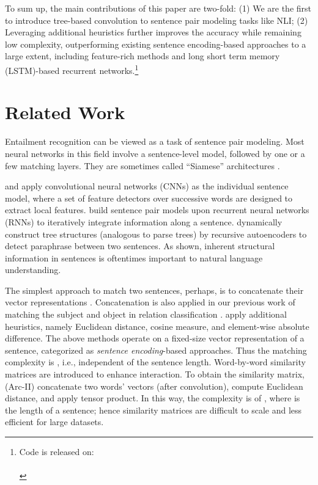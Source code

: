 \documentclass[11pt]{article}
\begin{document}
To sum up, the main contributions of this paper are two-fold: (1) We are the first to introduce tree-based convolution to sentence pair modeling tasks like NLI; (2) Leveraging additional heuristics further improves the accuracy while remaining low complexity, outperforming existing sentence encoding-based approaches to a large extent, including feature-rich methods and long short term memory (LSTM)-based recurrent networks.\footnote{
Code is released on:\\
{\color{white}}\quad{}\\
}
 



\vspace{-.1cm}
\section{Related Work}\label{sec:Related}

\vspace{-.1cm}
Entailment recognition can be viewed as a task of sentence pair modeling. Most neural networks in this field involve a sentence-level model, followed by one or a few matching layers. They are sometimes called ``Siamese'' architectures \cite{siamese}.

 and  apply convolutional neural networks (CNNs) as the individual sentence model, where a set of feature detectors over successive words are designed to extract local features.  build sentence pair models upon recurrent neural networks (RNNs) to iteratively integrate information along a sentence.  dynamically construct tree structures (analogous to parse trees) by recursive autoencoders to detect paraphrase between two sentences. As shown, inherent structural information in sentences is oftentimes important to natural language understanding.




The simplest approach to match two sentences, perhaps, is to concatenate their vector representations \cite[Arc-I]{DRR,CNN:NIPS}. Concatenation is also applied in our previous work of matching the subject and object in relation classification \cite{relation,relation2}.  apply additional heuristics, namely Euclidean distance, cosine measure, and element-wise absolute difference.
The above methods operate on a fixed-size vector representation of a sentence, categorized as \textit{sentence encoding}-based approaches. Thus the matching complexity is , i.e., independent of the sentence length. Word-by-word similarity matrices are introduced to enhance interaction. To obtain the similarity matrix,  (Arc-II) concatenate two words' vectors (after convolution),  compute Euclidean distance, and  apply tensor product. In this way, the complexity is of , where  is the length of a sentence; hence similarity matrices are difficult to scale and less efficient for large datasets.
\end{document}
